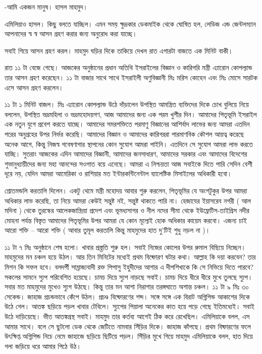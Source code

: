 \documentclass[
]{book}
\begin{document}
-আমি একজন মানুষ। হাসল মাহমুদ।

এমিলিয়াও হাসল। কিছু বলতে যাচ্ছিল। এমন সময় ক্ষুদ্রকার ডেকমাইক থেকে ঘোষিত হল, লেডিজ এন্ড জেন্টলম্যান আপনাদের স্ব স্ব আসন গ্রহণ করার জন্য অনুরোধ করা যাচ্ছে।

সবাই গিয়ে আসন গ্রহণ করল। মাহমুদ ঘড়ির দিকে তাকিয়ে দেখল রাত এগারটা বাজতে এক মিনিট বাকী।

রাত ১১ টা বেজে গেছে। আজকের অনুষ্ঠানের প্রধান অতিথি ইসরাইলের বিজ্ঞান ও কারিগরি মন্ত্রী এ্যারোন কোপল্যান্ড তার আসন গ্রহণ করেছেন। ১১ টা বাজার সাথে সাথে ইসরাইলী অণুবিজ্ঞানী মিঃ মরিস কোহেন এবং মিঃ মোসে সারটক এসে আসন গ্রহণ করলেন।

১১ টা ১ মিনিট বাজল। মিঃ এ্যারোন কোপল্যান্ড উঠে দাঁড়ালেন উপস্থিত আমন্ত্রিত ব্যক্তিদের দিকে চোখ বুলিয়ে নিয়ে বললেন, উপস্থিত ভদ্রমহিলা ও ভদ্রমহোদয়গণ, আজ আমাদের জন্য এক পরম খুশীর দিন। আমাদের পিতৃভূমি ইসরাইল এক নতুন যুগে প্রবেশ করতে যাচ্ছে। আমাদের সমরশক্তিতে পরমাণু বিজ্ঞানের আশির্বাদ লাভের জন্য আমরা এতদিন পরের অনুগ্রহের উপর নির্ভর করেছি। আমাদের বিজ্ঞান ও আমাদের কারিগররা পারমাণবিক কৌশল আয়ত্ব করেছে অনেক আগে, কিন্তু নিজস্ব গবেষণাগার স্থাপনের কোন সুযোগ আমরা পাইনি। এতদিনে সে সুযোগ আমরা লাভ করতে যাচ্ছি। সুতরাং আজকের এদিন আমাদের বিজ্ঞানী, আমাদের জনসাধারণ, আমাদের সরকার এবং আমাদের বিদেশের শুভানুধ্যায়ীদের জন্য মহা আনন্দের সওগাত বয়ে এনেছে। আমরা এ নিশ্চয়তা আজ সবাইকে দিতে পারি সেদিন বেশী দূরে নয়, যেদিন আমরা আমেরিকা ও রাশিয়ার মত ইন্টারকন্টিনেন্টাল ব্যালেষ্টিক মিসাইলের অধিকারী হবো।

শ্রোতমন্ডলি করতালি দিলেন। একটু থেমে মন্ত্রী মহোদয় আবার শুরু করলেন, পিতৃভূমির যে অংশটুকুর উপর আমরা অধিকার লাভ করেছি, তা নিয়ে আমরা কেউই সন্তুষ্ট নই, সন্তুষ্ট থাকতে পারি না। হেজাযের ইয়াসরেব নগরী ( আল মদিনা ) থেকে তুরস্কের আলেকজান্দ্রিয়া প্রদেশ এবং ভূমধ্যসাগর ও নীল নদের সীমা থেকে ইউফ্রেটিস-তাইগ্রিস নদীর মোহনা পর্যন্ত বিস্তৃত আমাদের পিতৃভূমির উপর আমরা যে কোন মূল্যেই হোক অধিকার কায়েম করবো। এজন্য চাই আরো শক্তি -- আরো শক্তি ( আবার তুমূল করতালি কিন্তু মাহমুদের হাত দু'টিই শুধু নড়ল না )।

১১ টা ৭ মিঃ অনুষ্ঠানে শেষ হলো। খাবার প্রস্ত্ততি শুরু হল। সবাই নিজের কোলের উপর রুমাল বিছিয়ে নিচ্ছেন। মাহমুদের মন চঞ্চল হয়ে উঠল। আর তিন মিনিটের মধ্যেই প্রথম বিষ্ফোরণ ঘটার কথা। আল্লাহ কি দয়া করবেন? তার মিশন কি সফল হবে। বলদর্পী সাম্রাজ্যবাদী রক্ত পিপাসু ইহুদীদের আশার এ দীপশিখাকে কি সে নিভিয়ে দিতে পারবে? সকলের সামনে স্যুপ পরিবেশিত হয়েছে। চামচ দিয়ে স্যুপ নাড়ছে সবাই। চামচ দিয়ে ধীরে ধীরে মুখে তুলছে স্যুপ। সবার মত মাহমুদের মুখেও স্যুপ উঠছে। কিন্তু তার মন আশা নিরাশার তরঙ্গঘাতে অশান্ত চঞ্চল। ১১ টা ৯ মিঃ ৩০ সেকেন্ড। জাহাজ প্রচন্ডভাবে কেঁপে উঠল। প্রচণ্ড বিষ্ফোরণের শব্দ। সঙ্গে সঙ্গে এক বিরাট অগ্নিপিন্ড আকাশের দিকে উঠে গেল। আতঙ্ক ছড়িয়ে পড়ল খাবার টেবিলে। স্যুপের পিয়ালা অনেকের কাত হয়ে পড়ে গেছে ইতিমধ্যেই। সবাই উঠে দাড়িয়েছে। ভীত আতঙ্কগ্রস্থ সবাই। মাহমুদ তার কর্তব্য আগেই ঠিক করে রেখেছিল। এমিলিয়াকে বলল, এস আমার সাথে। বলে সে ছুটলো ডেক থেকে জেটিতে নামবার সিঁড়ির দিকে। জাহাজ কাঁপছে। প্রথম বিষ্ফারণের ফলে উৎক্ষিপ্ত অগ্নিপিন্ড নিচে নেমে জাহাজে ছড়িয়ে ছিটিয়ে পড়ল। সিঁড়ির মুখে গিয়ে মাহমুদ এমিলিয়াকে বলল, হাত দিয়ে গলা জড়িয়ে ধরে আমার পিঠে উঠ।
\end{document}
